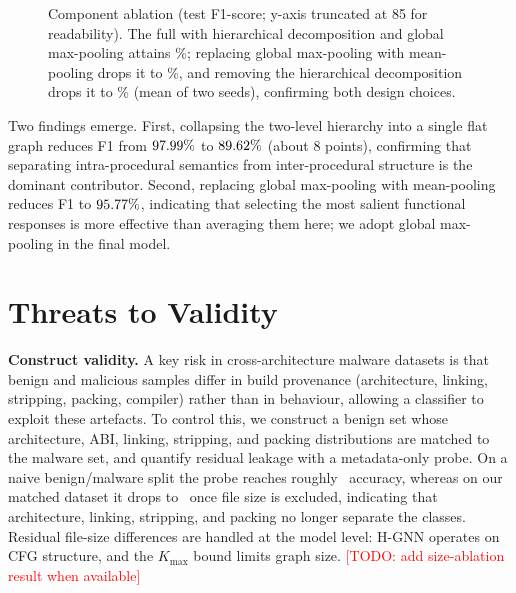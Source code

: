 \documentclass{llncs}
\begin{document}
\begin{figure}[!t]
\centering
{}
\caption{Component ablation (test F1-score; y-axis truncated at 85 for readability). The full  with hierarchical decomposition and global max-pooling attains \hgnnF\%; replacing global max-pooling with mean-pooling drops it to \ablMean\%, and removing the hierarchical decomposition drops it to \ablNoHier\% (mean of two seeds), confirming both design choices.}
\label{fig:ablation_study}
\end{figure}


Two findings emerge. First, collapsing the two-level hierarchy into a
single flat graph reduces F1 from $97.99\%$ to $89.62\%$
(about $8$ points), confirming that separating intra-procedural semantics
from inter-procedural structure is the dominant contributor. Second,
replacing global max-pooling with mean-pooling reduces F1 to $95.77\%$,
indicating that selecting the most salient functional responses is more
effective than averaging them here; we adopt global max-pooling in the
final model.


\section{Threats to Validity}
\label{sec:threats}

\textbf{Construct validity.} A key risk in cross-architecture malware datasets is that benign and
malicious samples differ in build provenance (architecture, linking, stripping, packing, compiler)
rather than in behaviour, allowing a classifier to exploit these artefacts. To control this, we
construct a benign set whose architecture, ABI, linking, stripping, and packing distributions are
matched to the malware set, and quantify residual leakage with a metadata-only probe. On a naive
benign/malware split the probe reaches roughly \hgnnProbeOld\ accuracy, whereas on our matched dataset
it drops to \hgnnProbeNoSize\ once file size is excluded, indicating that architecture, linking,
stripping, and packing no longer separate the classes. Residual file-size differences are handled at
the model level: H-GNN operates on CFG structure, and the $K_{\max}$ bound limits graph size.
\textcolor{red}{[TODO: add size-ablation result when available]}
\end{document}
